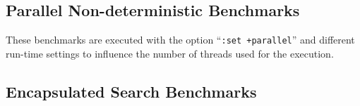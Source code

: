 \documentclass{article}
\begin{document}
\subsection{Parallel Non-deterministic Benchmarks}

These benchmarks are executed with the option ``\texttt{:set +parallel}''
and different run-time settings to influence the number
of threads used for the execution.

\begin{center}
\end{center}


\subsection{Encapsulated Search Benchmarks}

\begin{center}
\end{center}
\end{document}
